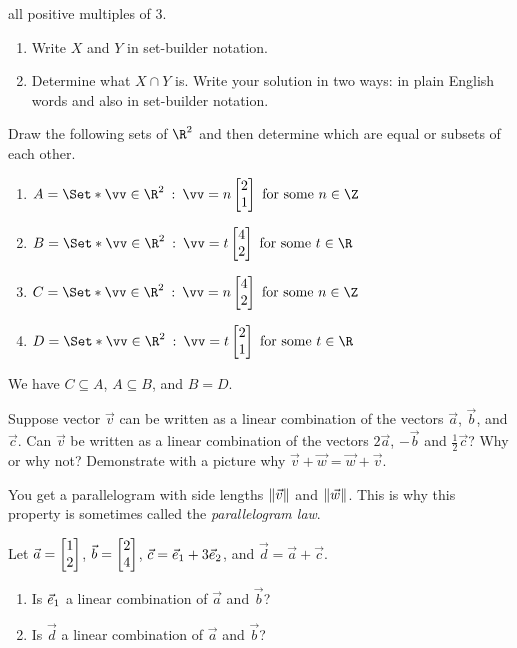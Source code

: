 \begin{exercises}
\begin{problist}
			all positive multiples of $3$.
			\begin{enumerate}
				\item Write $X$ and $Y$ in set-builder notation.
				\item Determine what $X\cap Y$ is. Write your solution in two ways: in
					plain English words and also in set-builder notation.
			\end{enumerate}
		\prob
			Draw the following sets of $\R^2$ and then determine which are equal or subsets of each other.
			\begin{enumerate}
				\item $A=\Set*{\vv\in\R^2\given \vv=n\mat{2\\1} \text{ for some }n\in\Z}$
				\item $B=\Set*{\vv\in\R^2\given \vv=t\mat{4\\2}\text{ for some }t\in\R}$
				\item $C=\Set*{\vv\in\R^2\given \vv=n\mat{4\\2} \text{ for some }n\in\Z}$
				\item $D=\Set*{\vv\in\R^2\given \vv=t\mat{2\\1}\text{ for some }t\in\R}$
			\end{enumerate}
			\begin{solution}
				We have $C\subseteq A$, $A\subseteq B$, and $B=D$.
			\end{solution}
		\prob
			Suppose vector $\vec v$ can be written as a linear combination of the
			vectors $\vec a$, $\vec b$, and $\vec c$. Can $\vec v$ be written as a
			linear combination of the vectors $2\vec a$, $-\vec b$ and
			$\frac12\vec c$? Why or why not?
		\prob
			Demonstrate with a picture why $\vec v + \vec w = \vec w + \vec v$.
			\begin{solution}
				You get a parallelogram with side lengths $\lVert\vec v\rVert$ and
				$\lVert\vec w\rVert$. This is why this property is sometimes called the
				\emph{parallelogram law}.
			\end{solution}
		\prob Let $\vec a=\mat{1\\2}$, $\vec b=\mat{2\\4}$, $\vec c={\vec e_1}+3{\vec e_2}$, and $\vec d=\vec a+\vec c$.
		\begin{enumerate}
			\item Is ${\vec e_1}$ a linear combination of $\vec a$ and $\vec b$?
			\item Is $\vec d$ a linear combination of $\vec a$ and $\vec b$?

\end{enumerate}
\end{problist}
\end{exercises}
